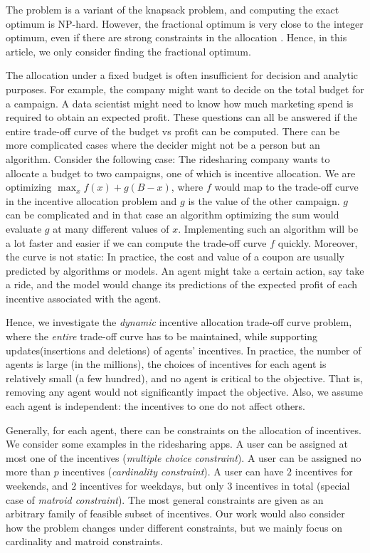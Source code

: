 \documentclass{article}
\begin{document}
The problem is a variant of the knapsack problem, and computing the exact optimum is NP-hard. However, the fractional optimum is very close to the integer optimum, even if there are strong constraints in the allocation \cite{CAMERINI1984157}. Hence, in this article, we only consider finding the fractional optimum.

The allocation under a fixed budget is often insufficient for decision and analytic purposes. For example, the company might want to decide on the total budget for a campaign. A data scientist might need to know how much marketing spend is required to obtain an expected profit. These questions can all be answered if the entire trade-off curve of the budget vs profit can be computed.
There can be more complicated cases where the decider might not be a person but an algorithm. Consider the following case: The ridesharing company wants to allocate a budget to two campaigns, one of which is incentive allocation. We are optimizing $\max_x f(x)+g(B-x)$, where $f$ would map to the trade-off curve in the incentive allocation problem and $g$ is the value of the other campaign. $g$ can be complicated and in that case an algorithm optimizing the sum would evaluate $g$ at many different values of $x$. Implementing such an algorithm will be a lot faster and easier if we can compute the trade-off curve $f$ quickly.
Moreover, the curve is not static: In practice, the cost and value of a coupon are usually predicted by algorithms or models. An agent might take a certain action, say take a ride, and the model would change its predictions of the expected profit of each incentive associated with the agent. 

Hence, we investigate the \emph{dynamic} incentive allocation trade-off curve problem, where the \emph{entire} trade-off curve has to be maintained, while supporting updates(insertions and deletions) of agents' incentives. 
In practice, the number of agents is large (in the millions), the choices of incentives for each agent is relatively small (a few hundred), and no agent is critical to the objective. That is, removing any agent would not significantly impact the objective. Also, we assume each agent is independent: the incentives to one do not affect others. 

Generally, for each agent, there can be constraints on the allocation of incentives. We consider some examples in the ridesharing apps. A user can be assigned at most one of the incentives (\emph{multiple choice constraint}). A user can be assigned no more than $p$ incentives (\emph{cardinality constraint}). A user can have $2$ incentives for weekends, and $2$ incentives for weekdays, but only $3$ incentives in total (special case of \emph{matroid constraint}). The most general constraints are given as an arbitrary family of feasible subset of incentives. Our work would also consider how the problem changes under different constraints, but we mainly focus on cardinality and matroid constraints. 
\end{document}
